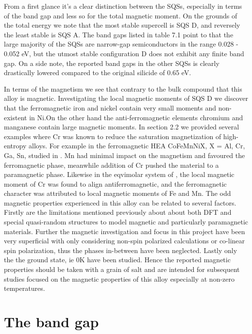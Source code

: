 From a first glance it's a clear distinction between the SQSs, especially in terms of the band gap and less so for the total magnetic moment. On the grounds of the total energy we note that the most stable supercell is SQS D, and reversely the least stable is SQS A. The band gaps listed in table 7.1 point to that the large majority of the SQSs are narrow-gap semiconductors in the range 0.028 - 0.052 eV, but the utmost stable configuration D does not exhibit any finite band gap. On a side note, the reported band gaps in the other SQSs is clearly drastically lowered compared to the original silicide of 0.65 eV. 

In terms of the magnetism we see that contrary to the bulk  compound that this alloy is magnetic. Investigating the local magnetic moments of SQS D we discover that the ferromagnetic iron and nickel contain very small moments and non-existent in Ni.On the other hand the anti-ferromagnetic elements chromium and manganese contain large magnetic moments. In section 2.2 we provided several examples where Cr was known to reduce the saturation magnetization of high-entropy alloys. For example in the ferromagnetic HEA CoFeMnNiX, X = Al, Cr, Ga, Sn, studied in \cite{ZUO201710}. Mn had minimal impact on the magnetism and favoured the ferromagnetic phase, meanwhile addition of Cr pushed the material to a paramagnetic phase. Likewise in the eqvimolar system of  \cite{PhysRevB.96.014437}, the local magnetic moment of Cr was found to align antiferromagnetic, and the ferromagnetic character was attributed to local magnetic moments of Fe and Mn. The odd magnetic properties experienced in this alloy can be related to several factors. Firstly are the limitations mentioned previously about about both DFT and special quasi-random structures to model magnetic and particularly paramagnetic materials. Further the magnetic investigation and focus in this project have been very superficial with only considering non-spin polarized calculations or co-linear spin polarization, thus the phases in-between have been neglected. Lastly only the the ground state, ie 0K have been studied. Hence the reported magnetic properties should be taken with a grain of salt and are intended for subsequent studies focused on the magnetic properties of this alloy especially at non-zero temperatures. 

\section{The band gap}

